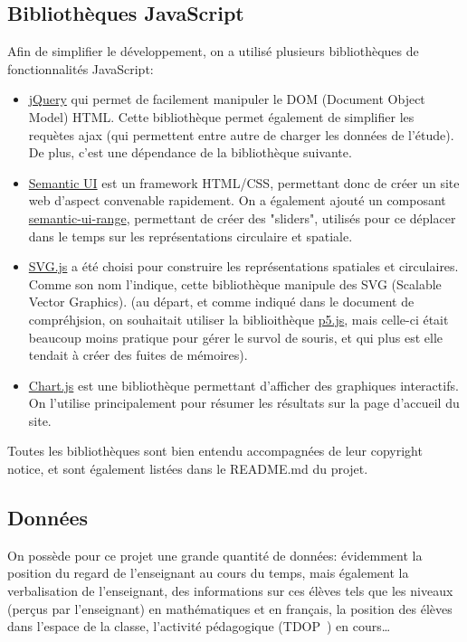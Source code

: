 \documentclass{article}
\begin{document}
\subsection{Bibliothèques JavaScript}
Afin de simplifier le développement, on a utilisé plusieurs bibliothèques de fonctionnalités JavaScript:
\begin{itemize}
    \item \href{https://jquery.com/}{jQuery} qui permet de facilement manipuler le DOM (Document Object Model) HTML. Cette bibliothèque permet également de simplifier les requètes ajax (qui permettent entre autre de charger les données de l'étude). De plus, c'est une dépendance de la bibliothèque suivante.
    \item \href{https://semantic-ui.com/}{Semantic UI} est un framework HTML/CSS, permettant donc de créer un site web d'aspect convenable rapidement. On a également ajouté un composant \href{https://tyleryasaka.github.io/semantic-ui-range/}{semantic-ui-range}, permettant de créer des "sliders", utilisés pour ce déplacer dans le temps sur les représentations circulaire et spatiale.
    \item \href{http://svgjs.com/}{SVG.js} a été choisi pour construire les représentations spatiales et circulaires. Comme son nom l'indique, cette bibliothèque manipule des SVG (Scalable Vector Graphics). (au départ, et comme indiqué dans le document de compréhjsion, on souhaitait utiliser la biblioithèque \href{https://p5js.org/}{p5.js}, mais celle-ci était beaucoup moins pratique pour gérer le survol de souris, et qui plus est elle tendait à créer des fuites de mémoires).
    \item \href{http://www.chartjs.org/}{Chart.js} est une bibliothèque permettant d'afficher des graphiques interactifs. On l'utilise principalement pour résumer les résultats sur la page d'accueil du site.
\end{itemize}
Toutes les bibliothèques sont bien entendu accompagnées de leur copyright notice, et sont également listées dans le README.md du projet.

\subsection{Données}
On possède pour ce projet une grande quantité de données: évidemment la position du regard de l'enseignant au cours du temps, mais également la verbalisation de l'enseignant, des informations sur ces élèves tels que les niveaux (perçus par l'enseignant) en mathématiques et en français, la position des élèves dans l'espace de la classe, l'activité pédagogique (TDOP~\cite{TDOP}) en cours\ldots
\end{document}
